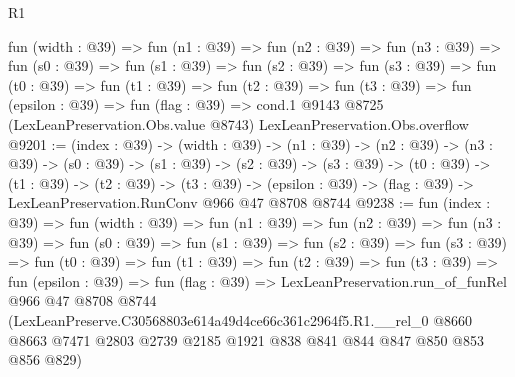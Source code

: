 \begin{lexlean}{R1}
\begin{coremodule}
  fun (width : @39) =>
  fun (n1 : @39) =>
  fun (n2 : @39) =>
  fun (n3 : @39) =>
  fun (s0 : @39) =>
  fun (s1 : @39) =>
  fun (s2 : @39) =>
  fun (s3 : @39) =>
  fun (t0 : @39) =>
  fun (t1 : @39) =>
  fun (t2 : @39) =>
  fun (t3 : @39) =>
  fun (epsilon : @39) =>
  fun (flag : @39) =>
  cond.{1} @9143 @8725 (LexLeanPreservation.Obs.value @8743) LexLeanPreservation.Obs.overflow
@9201 := (index : @39) ->
  (width : @39) ->
  (n1 : @39) ->
  (n2 : @39) ->
  (n3 : @39) ->
  (s0 : @39) ->
  (s1 : @39) ->
  (s2 : @39) ->
  (s3 : @39) ->
  (t0 : @39) ->
  (t1 : @39) ->
  (t2 : @39) ->
  (t3 : @39) -> (epsilon : @39) -> (flag : @39) -> LexLeanPreservation.RunConv @966 @47 @8708 @8744
@9238 := fun (index : @39) =>
  fun (width : @39) =>
  fun (n1 : @39) =>
  fun (n2 : @39) =>
  fun (n3 : @39) =>
  fun (s0 : @39) =>
  fun (s1 : @39) =>
  fun (s2 : @39) =>
  fun (s3 : @39) =>
  fun (t0 : @39) =>
  fun (t1 : @39) =>
  fun (t2 : @39) =>
  fun (t3 : @39) =>
  fun (epsilon : @39) =>
  fun (flag : @39) =>
  LexLeanPreservation.run_of_funRel
    @966
    @47
    @8708
    @8744
    (LexLeanPreserve.C30568803e614a49d4ce66c361c2964f5.R1.__rel_0
      @8660
      @8663
      @7471
      @2803
      @2739
      @2185
      @1921
      @838
      @841
      @844
      @847
      @850
      @853
      @856
      @829)
\end{coremodule}
\end{lexlean}
